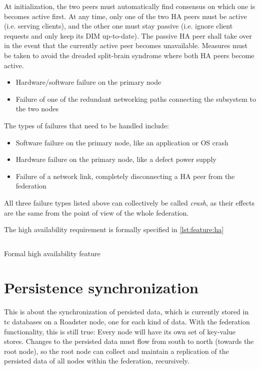 At initialization, the two peers must automatically find consensus on which one
is becomes active first.  At any time, only one of the two HA peers must be
active (i.e. serving clients), and the other one must stay passive (i.e. ignore
client requests and only keep its DIM up-to-date). The passive HA peer shall
take over in the event that the currently active peer becomes unavailable.
Measures must be taken to avoid the dreaded split-brain syndrome where both HA
peers become active.

\begin{itemize}
	\item Hardware/software failure on the primary node %
	\item Failure of one of the redundant networking paths connecting the subsystem to the two nodes %
\end{itemize}

The types of failures that need to be handled include:
\begin{itemize}
	\item Software failure on the primary node, like an application or OS crash
	\item Hardware failure on the primary node, like a defect power supply
	\item Failure of a network link, completely disconnecting a HA peer from the federation
\end{itemize}

All three failure types listed above can collectively be called \emph{crash},
as their effects are the same from the point of view of the whole federation.

The high availability requirement is formally specified in \autoref{lst:feature:ha}

\begin{listing}
	\inputminted{Gherkin}{listings/features/high_availability.feature}
	\caption{Formal high availability feature}
	\label{lst:feature:ha}
\end{listing}

\section{Persistence synchronization}
This is about the synchronization of persisted data, which is currently stored
in \gls{tc} databases on a Roadster node, one for each kind of data. With the federation functionality, this is
still true: Every node will have its own set of key-value stores. Changes to the persisted
data must flow from south to north (towards the root node), so the root
node can collect and maintain a replication of the persisted data of all
nodes within the federation, recursively.

